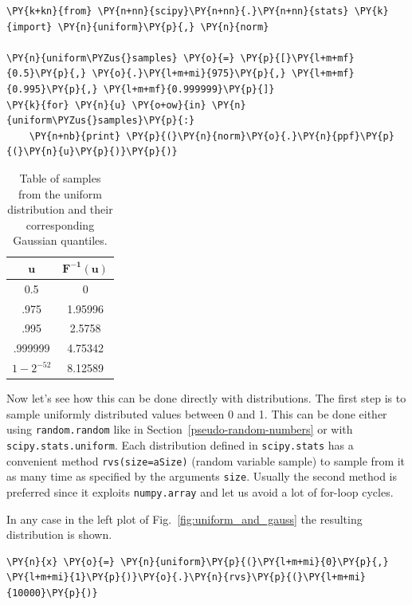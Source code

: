 \begin{tcolorbox}[breakable, size=fbox, boxrule=1pt, pad at break*=1mm,colback=cellbackground, colframe=cellborder]
\begin{Verbatim}[commandchars=\\\{\}]
\PY{k+kn}{from} \PY{n+nn}{scipy}\PY{n+nn}{.}\PY{n+nn}{stats} \PY{k}{import} \PY{n}{uniform}\PY{p}{,} \PY{n}{norm}
		
\PY{n}{uniform\PYZus{}samples} \PY{o}{=} \PY{p}{[}\PY{l+m+mf}{0.5}\PY{p}{,} \PY{o}{.}\PY{l+m+mi}{975}\PY{p}{,} \PY{l+m+mf}{0.995}\PY{p}{,} \PY{l+m+mf}{0.999999}\PY{p}{]}
\PY{k}{for} \PY{n}{u} \PY{o+ow}{in} \PY{n}{uniform\PYZus{}samples}\PY{p}{:}
    \PY{n+nb}{print} \PY{p}{(}\PY{n}{norm}\PY{o}{.}\PY{n}{ppf}\PY{p}{(}\PY{n}{u}\PY{p}{)}\PY{p}{)}
\end{Verbatim}
\end{tcolorbox}

\begin{table}[h]
  \centering
  \begin{tabular}{|c|c|}
    \hline
    \(\mathbf{u}\) & \(\mathbf{F^{-1}(u)}\) \\
    \hline
    0.5 & 0 \\
    \hline
    .975 & 1.95996 \\
    \hline
    .995 & 2.5758 \\
    \hline
    .999999 & 4.75342 \\
    \hline
    \(1-2^{-52}\) & 8.12589 \\
    \hline
  \end{tabular}
  \caption{Table of samples from the uniform distribution and their corresponding Gaussian quantiles.}
\label{tab:transformation}
\end{table}

Now let's see how this can be done directly with distributions. The first step is to sample
uniformly distributed values between 0 and 1. This can be done either using \texttt{random.random} like in Section~\ref{pseudo-random-numbers} or with \texttt{scipy.stats.uniform}. Each distribution defined in \texttt{scipy.stats} has a convenient method \texttt{rvs(size=aSize)} (random variable sample) to sample from it as many time as specified by the arguments \texttt{size}. Usually the second method is preferred since it exploits \texttt{numpy.array} and let us avoid a lot of for-loop cycles.

In any case in the left plot of Fig.~\ref{fig:uniform_and_gauss} the resulting distribution is shown.

\begin{tcolorbox}[breakable, size=fbox, boxrule=1pt, pad at break*=1mm,colback=cellbackground, colframe=cellborder]
\begin{Verbatim}[commandchars=\\\{\}]
\PY{n}{x} \PY{o}{=} \PY{n}{uniform}\PY{p}{(}\PY{l+m+mi}{0}\PY{p}{,} \PY{l+m+mi}{1}\PY{p}{)}\PY{o}{.}\PY{n}{rvs}\PY{p}{(}\PY{l+m+mi}{10000}\PY{p}{)}
\end{Verbatim}
\end{tcolorbox}

